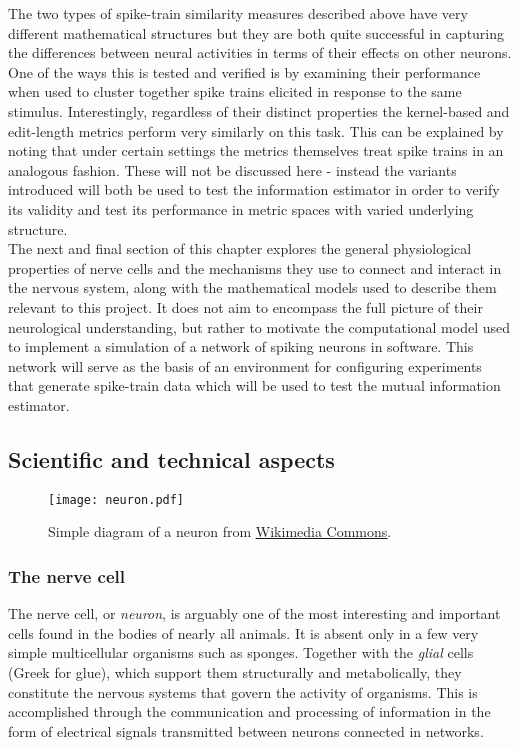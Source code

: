 \documentclass[12pt]{extarticle}
\begin{document}
\noindent
The two types of spike-train similarity measures described above have
very different mathematical structures but they are both quite
successful in capturing the differences between neural activities in
terms of their effects on other neurons. One of the ways this is
tested and verified is by examining their performance when used to
cluster together spike trains elicited in response to the same
stimulus. Interestingly, regardless of their distinct properties the
kernel-based and edit-length metrics perform very similarly on this
task. This can be explained by noting that under certain settings the
metrics themselves treat spike trains in an analogous fashion. These
will not be discussed here - instead the variants introduced will both
be used to test the information estimator in order to verify its
validity and test its performance in metric spaces with varied
underlying structure.\\

\noindent
The next and final section of this chapter explores the general
physiological properties of nerve cells and the mechanisms they use to
connect and interact in the nervous system, along with the
mathematical models used to describe them relevant to this project. It
does not aim to encompass the full picture of their neurological
understanding, but rather to motivate the computational model used to
implement a simulation of a network of spiking neurons in
software. This network will serve as the basis of an environment for
configuring experiments that generate spike-train data which will be
used to test the mutual information estimator.\\

\newpage
\subsection{Scientific and technical aspects}

\begin{figure}[H]
	\centering
	\texttt{[image: neuron.pdf]}
    \caption{Simple diagram of a neuron from \href{https://commons.wikimedia.org/wiki/File:Dendrite_(PSF).svg}{\underline{Wikimedia Commons}}.}
\end{figure}

\subsubsection*{The nerve cell}
\noindent
The nerve cell, or \textit{neuron}, is arguably one of the most
interesting and important cells found in the bodies of nearly all
animals. It is absent only in a few very simple multicellular
organisms such as sponges. Together with the \textit{glial} cells
(Greek for glue), which support them structurally and metabolically,
they constitute the nervous systems that govern the activity of
organisms. This is accomplished through the communication and
processing of information in the form of electrical signals
transmitted between neurons connected in networks.\\
\end{document}

